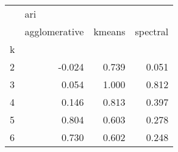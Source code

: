 \begin{tabular}{lrrr}
\toprule
{} & \multicolumn{3}{l}{ari} \\
{} & agglomerative & kmeans & spectral \\
k &               &        &          \\
\midrule
2 &        -0.024 &  0.739 &    0.051 \\
3 &         0.054 &  1.000 &    0.812 \\
4 &         0.146 &  0.813 &    0.397 \\
5 &         0.804 &  0.603 &    0.278 \\
6 &         0.730 &  0.602 &    0.248 \\
\bottomrule
\end{tabular}

